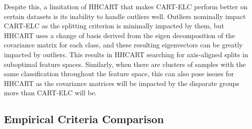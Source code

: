 \documentclass[10pt]{article} %
\begin{document}
Despite this, a limitation of HHCART that makes CART-ELC perform better on certain datasets is its inability to handle outliers well. Outliers nominally impact CART-ELC as the splitting criterion is minimally impacted by them, but HHCART uses a change of basis derived from the eigen decomposition of the covariance matrix for each class, and these resulting eigenvectors can be greatly impacted by outliers. This results in HHCART searching for axis-aligned splits in suboptimal feature spaces. Similarly, when there are clusters of samples with the same classification throughout the feature space, this can also pose issues for HHCART as the covariance matrices will be impacted by the disparate groups more than CART-ELC will be.

\subsection{Empirical Criteria Comparison}\label{empirical_criteria_comparison}
\end{document}
